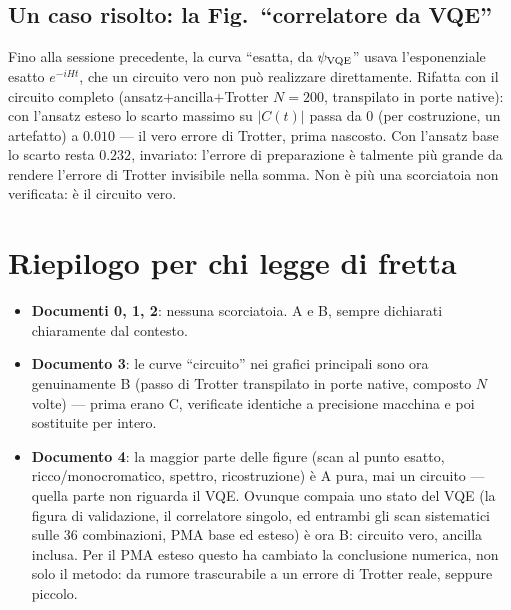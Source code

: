 \documentclass[11pt,a4paper]{article}
\begin{document}

\subsection*{Un caso risolto: la Fig.~``correlatore da VQE''}

Fino alla sessione precedente, la curva ``esatta, da $\psi_{\rm VQE}$'' usava
l'esponenziale esatto $e^{-iHt}$, che un circuito vero non può realizzare
direttamente. Rifatta con il circuito completo (ansatz$+$ancilla$+$Trotter
$N{=}200$, transpilato in porte native): con l'ansatz esteso lo scarto
massimo su $|C(t)|$ passa da $0$ (per costruzione, un artefatto) a $0.010$
--- il vero errore di Trotter, prima nascosto. Con l'ansatz base lo scarto
resta $0.232$, invariato: l'errore di preparazione è talmente più grande da
rendere l'errore di Trotter invisibile nella somma. Non è più una
scorciatoia non verificata: è il circuito vero.

\section*{Riepilogo per chi legge di fretta}

\begin{itemize}[leftmargin=1.5em,itemsep=3pt]
\item \textbf{Documenti 0, 1, 2}: nessuna scorciatoia. A e B, sempre
dichiarati chiaramente dal contesto.
\item \textbf{Documento 3}: le curve ``circuito'' nei grafici principali
sono ora genuinamente B (passo di Trotter transpilato in porte native,
composto $N$ volte) --- prima erano C, verificate identiche a precisione
macchina e poi sostituite per intero.
\item \textbf{Documento 4}: la maggior parte delle figure (scan al punto
esatto, ricco/monocromatico, spettro, ricostruzione) è A pura, mai un circuito ---
quella parte non riguarda il VQE. Ovunque compaia uno stato del VQE (la
figura di validazione, il correlatore singolo, ed entrambi gli scan
sistematici sulle 36 combinazioni, PMA base ed esteso) è ora B: circuito
vero, ancilla inclusa. Per il PMA esteso questo ha cambiato la conclusione
numerica, non solo il metodo: da rumore trascurabile a un errore di
Trotter reale, seppure piccolo.
\end{itemize}
\end{document}
